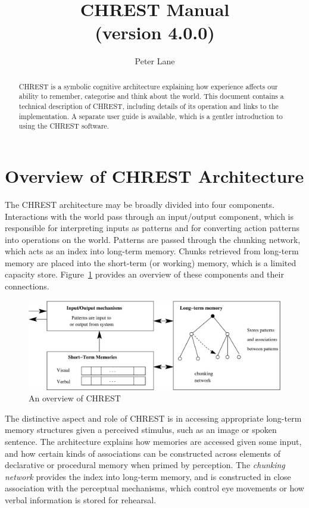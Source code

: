 \documentclass{article}
\title{CHREST Manual \\ (version 4.0.0)}
\author{Peter Lane}
\begin{document}
\maketitle

\begin{abstract}

\noindent CHREST is a symbolic cognitive architecture explaining how experience
affects our ability to remember, categorise and think about the world.  This
document contains a technical description of CHREST, including details of its
operation and links to the implementation.  A separate user guide is available,
which is a gentler introduction to using the CHREST software.

\end{abstract}

\tableofcontents
\newpage

\section{Overview of CHREST Architecture}

The CHREST architecture may be broadly divided into four components.
Interactions with the world pass through an input/output component, which is
responsible for interpreting inputs as patterns and for converting action
patterns into operations on the world.  Patterns are passed through the
chunking network, which acts as an index into long-term memory.  Chunks
retrieved from long-term memory are placed into the short-term (or working)
memory, which is a limited capacity store.  Figure~\ref{chrest-architecture}
provides an overview of these components and their connections.

\begin{figure}
\includegraphics[width=\textwidth]{figures/chrest.eps}
\caption{An overview of CHREST}
\label{chrest-architecture}
\end{figure}

The distinctive aspect and role of CHREST is in accessing appropriate long-term
memory structures given a perceived stimulus, such as an image or spoken
sentence.  The architecture explains how memories are accessed given some
input, and how certain kinds of associations can be constructed across elements
of declarative or procedural memory when primed by perception.  The {\em
chunking network} provides the index into long-term memory, and is constructed
in close association with the perceptual mechanisms, which control eye
movements or how verbal information is stored for rehearsal.
\end{document}
